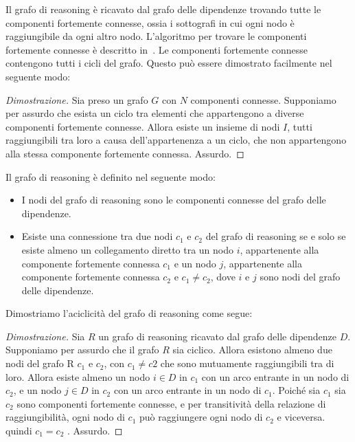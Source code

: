 Il grafo di reasoning è ricavato dal grafo delle dipendenze trovando tutte le componenti fortemente connesse, ossia i sottografi in cui ogni nodo è raggiungibile da ogni altro nodo. L'algoritmo per trovare le componenti fortemente connesse è descritto in~\cite{Tarjan72depthfirst}.
Le componenti fortemente connesse contengono tutti i cicli del grafo. Questo può essere dimostrato facilmente nel seguente modo:

\begin{proof}[Dimostrazione]
Sia preso un grafo $G$ con $N$ componenti connesse.
Supponiamo per assurdo che esista un ciclo tra elementi che appartengono a diverse componenti fortemente connesse.
Allora esiste un insieme di nodi $I$, tutti raggiungibili tra loro a causa dell'appartenenza a un ciclo, che non appartengono alla stessa componente fortemente connessa. Assurdo.
\end{proof}

Il grafo di reasoning è definito nel seguente modo:

\begin{itemize}
 \item I nodi del grafo di reasoning sono le componenti connesse del grafo delle dipendenze.
 \item Esiste una connessione tra due nodi $c_1$ e $c_2$ del grafo di reasoning  se e solo se esiste almeno un collegamento diretto tra un nodo $i$, appartenente alla componente fortemente connessa $c_1$ e un nodo $j$, appartenente alla componente fortemente connessa $c_2$ e $c_1\neq c_2$, dove $i$ e $j$ sono nodi del grafo delle dipendenze.
\end{itemize}

Dimostriamo l'aciclicità del grafo di reasoning come segue:

\begin{proof}[Dimostrazione]
Sia $R$ un grafo di reasoning ricavato dal grafo delle dipendenze $D$.
Supponiamo per assurdo che il grafo $R$ sia ciclico. Allora esistono almeno due nodi del grafo R $c_1$ e $c_2$, con $c_1\neq c2$ che sono mutuamente raggiungibili tra di loro. 
Allora esiste almeno un nodo $i\in D$ in $c_1$ con un arco entrante in un nodo di $c_2$, e un nodo $j\in D$ in $c_2$ con un arco entrante in un nodo di $c_1$. Poiché sia $c_1$ sia $c_2$ sono componenti fortemente connesse, e per transitività della relazione di raggiungibilità, ogni nodo di $c_1$ può raggiungere ogni nodo di $c_2$ e viceversa. quindi $c_1=c_2$ . Assurdo.
\end{proof}

